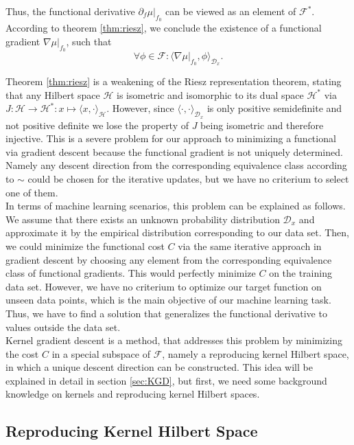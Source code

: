 \documentclass[11pt, a4paper]{article}
\newcommand{\D}{\mathcal{D}}
\newcommand{\F}{\mathcal{F}}
\renewcommand{\H}{\mathcal{H}}
\begin{document}
Thus, the functional derivative $\partial_f \mu |_{f_0}$ can be viewed as an element of $\F^*$. According to theorem \ref{thm:riesz}, we conclude the existence of a functional gradient $\nabla \mu |_{f_0}$, such that
\[ \forall \phi \in \F: \big \langle \nabla \mu |_{f_0}, \phi \big \rangle_{\D_x}. \]

Theorem \ref{thm:riesz} is a weakening of the Riesz representation theorem, stating that any Hilbert space $\H$ is isometric and isomorphic to its dual space $\H^*$ via  $J:\H \to \H^* : x \mapsto \langle x , \cdot \rangle_\H$. However, since $\langle \cdot , \cdot \rangle_{\D_x}$ is only positive semidefinite and not positive definite we lose the property of $J$ being isometric and therefore injective. This is a severe problem for our approach to minimizing a functional via gradient descent because the functional gradient is not uniquely determined. Namely any descent direction from the corresponding equivalence class according to $\sim$ could be chosen for the iterative updates, but we have no criterium to select one of them. \\

In terms of machine learning scenarios, this problem can be explained as follows. We assume that there exists an unknown probability distribution $\D_x$ and approximate it by the empirical distribution corresponding to our data set. Then, we could minimize the functional cost $C$ via the same iterative approach in gradient descent by choosing any element from the corresponding equivalence class of functional gradients. This would perfectly minimize $C$ on the training data set. However, we have no criterium to optimize our target function on unseen data points, which is the main objective of our machine learning task. Thus, we have to find a solution that generalizes the functional derivative to values outside the data set.  \\

Kernel gradient descent is a method, that addresses this problem by minimizing the cost $C$ in a special subspace of $\F$, namely a reproducing kernel Hilbert space, in which a unique descent direction can be constructed. This idea will be explained in detail in section \ref{sec:KGD}, but first, we need some background knowledge on kernels and reproducing kernel Hilbert spaces. 

\subsection{Reproducing Kernel Hilbert Space}
\end{document}

